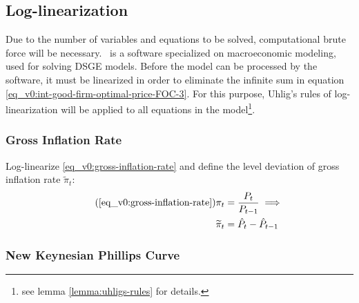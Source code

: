 \documentclass[../thesis.tex]{subfiles}
\begin{document}
	
	
	\subsection{Log-linearization}
	
	Due to the number of variables and equations to be solved, computational brute force will be necessary. \dynare \ is a software specialized on macroeconomic modeling, used for solving DSGE models. Before the model can be processed by the software, it must be linearized in order to eliminate the infinite sum in equation \ref{eq_v0:int-good-firm-optimal-price-FOC-3}. For this purpose, Uhlig's rules of log-linearization \cite{uhlig_toolkit_1999} will be applied to all equations in the model\footnote{see lemma \ref{lemma:uhligs-rules} for details.}.
	
	
	\subsubsection*{Gross Inflation Rate}
	
	Log-linearize \ref{eq_v0:gross-inflation-rate} and define the level deviation of gross inflation rate $\widetilde{\pi}_t$:
	\begin{align}
		\tag{\ref{eq_v0:gross-inflation-rate}}
		\pi_t &= \frac{P_t}{P_{t-1}} \implies \\
		\widetilde{\pi}_t &= \hat{P}_t - \hat{P}_{t-1}
		\label{eq_v0:level-dev-gross-inflation-rate}
	\end{align}
	
	
	\subsubsection*{New Keynesian Phillips Curve}
	
\end{document}
